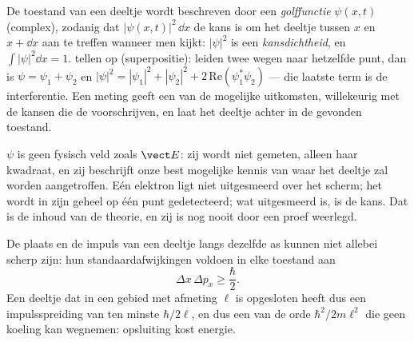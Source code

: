 \begin{definition}[Golffunctie]\label{def:b1:quantum-introduction:wavefunction}
De toestand van een deeltje wordt beschreven door een \emph{golffunctie}
$\psi(x, t)$ (complex), zodanig dat $|\psi(x, t)|^2\,\dd x$ de
kans is om het deeltje tussen $x$ en $x + \dd x$ aan te treffen wanneer men
kijkt: $|\psi|^2$ is een \emph{kansdichtheid}, en $\int|\psi|^2\dd x =
1$.  tellen op (superpositie): leiden twee wegen naar hetzelfde
punt, dan is $\psi = \psi_1 + \psi_2$ en $|\psi|^2 = |\psi_1|^2 + |\psi_2|^2 +
2\,\mathrm{Re}(\psi_1^\ast\psi_2)$ --- die laatste term is de interferentie.
Een meting geeft een van de mogelijke uitkomsten, willekeurig met de
kansen die de  voorschrijven, en laat het deeltje achter in de
gevonden toestand.
\end{definition}

\begin{remark}\label{rem:b1:quantum-introduction:whatwaves}
$\psi$ is geen fysisch veld zoals $\vect E$: zij wordt niet gemeten, alleen
haar kwadraat, en zij beschrijft onze best mogelijke kennis van waar
het deeltje zal worden aangetroffen. Eén elektron ligt niet uitgesmeerd over het
scherm; het wordt in zijn geheel op één punt gedetecteerd; wat uitgesmeerd is, is de
kans. Dat is de inhoud van de theorie, en zij is nog nooit door een
proef weerlegd.
\end{remark}

\begin{theorem}\label{thm:b1:quantum-introduction:heisenberg}
De plaats en de impuls van een deeltje langs dezelfde as kunnen niet
allebei scherp zijn: hun standaardafwijkingen voldoen in elke toestand aan
\[
\Delta x\,\Delta p_x \geq \frac{\hbar}{2} .
\]
Een deeltje dat in een gebied met afmeting $\ell$ is opgesloten heeft dus een
impulsspreiding van ten minste $\hbar/2\ell$, en dus een  van de orde
$\hbar^2/2m\ell^2$ die geen koeling kan wegnemen: opsluiting kost energie.
\end{theorem}
\admitted

